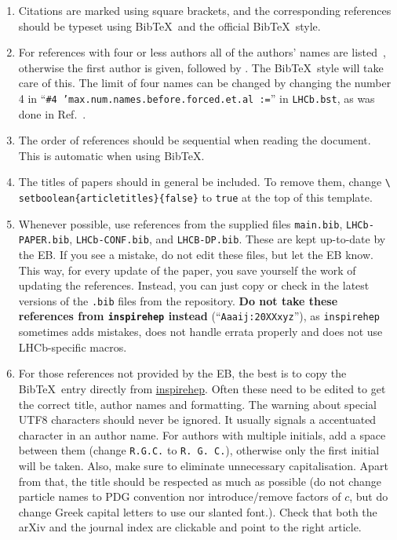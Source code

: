 \begin{enumerate}

\item Citations are marked using square brackets, and the
  corresponding references should be typeset using Bib\TeX\ and the
  official \lhcb Bib\TeX\ style. 

\item For references with four or less authors all of the authors'
  names are listed~\cite{Lee:1967iu}, otherwise the first author
  is given, followed by \etal. The \lhcb Bib\TeX\ style will
  take care of this. The limit of four names can be changed by changing the number 4 in 
  ``{\tt \#4 'max.num.names.before.forced.et.al :=}''
  in {\tt LHCb.bst}, as was done in Ref.~\cite{LHCb-PAPER-2017-038}.

\item The order of references should be sequential when reading the
  document. This is automatic when using Bib\TeX.

\item The titles of papers should in general be included. To remove
  them, change \texttt{\textbackslash
    setboolean\{articletitles\}\{false\}} to \texttt{true} at the top
  of this template.

\item Whenever possible, use references from the supplied files
\verb!main.bib!, \verb!LHCb-PAPER.bib!, \verb!LHCb-CONF.bib!, and \verb!LHCB-DP.bib!.
These are kept up-to-date by the EB. If you see a mistake, do not edit these files,
but let the EB know. This way, for every update of the paper, you save
yourself the work of updating the references. Instead, you can just copy or
check in the latest versions of the \verb!.bib! files from the repository.
{\bf Do not take these references from \texttt{inspirehep} instead} (``{\tt Aaaij:20XXxyz}''), as \texttt{inspirehep} sometimes adds mistakes, does not handle errata properly and does not use LHCb-specific macros.

\item For those references not provided by the EB, the best
  is to copy the Bib\TeX\ entry directly from
  \href{http://inspirehep.net}{inspirehep}.
    Often these need to be edited to get the 
  correct title, author names and formatting. The warning about special UTF8 characters should never be ignored. It usually signals a accentuated character in an author name.
  For authors with multiple initials, add a space between them (change \texttt{R.G.C.} to \texttt{R. G. C.}),
  otherwise only the first initial will be taken. 
  Also, make sure to eliminate unnecessary capitalisation.
  Apart from that, the title should be respected as much as possible
  (\eg do not change particle names to PDG convention nor introduce/remove factors of $c$, but do change Greek capital letters to use our slanted font.).
  Check that both the arXiv and the journal index are clickable
  and point to the right article.


\end{enumerate}
